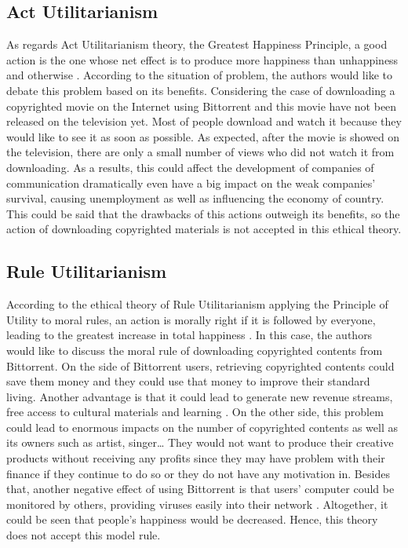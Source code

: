 \documentclass[conference]{IEEEtran}
\begin{document}
\subsection{Act Utilitarianism}
As regards Act Utilitarianism theory, the Greatest Happiness Principle, a good action is the one whose net effect is to produce more happiness than unhappiness and otherwise \cite{quinn2014ethics}. According to the situation of problem, the authors would like to debate this problem based on its benefits. Considering the case of downloading a copyrighted movie on the Internet using Bittorrent and this movie have not been released on the television yet. Most of people download and watch it because they would like to see it as soon as possible. As expected, after the movie is showed on the television, there are only a small number of views who did not watch it from downloading. As a results, this could affect the development of companies of communication dramatically even have a big impact on the weak companies’ survival, causing unemployment as well as influencing the economy of country. This could be said that the drawbacks of this actions outweigh its benefits, so the action of downloading copyrighted materials is not accepted in this ethical theory.
\cite{bittorentmedia}


\subsection{Rule Utilitarianism}
According to the ethical theory of Rule Utilitarianism applying the Principle of Utility to moral rules, an action is morally right if it is followed by everyone, leading to the greatest increase in total happiness \cite{quinn2014ethics}. In this case, the authors would like to discuss the moral rule of downloading copyrighted contents from Bittorrent. On the side of Bittorrent users, retrieving copyrighted contents could save them money and they could use that money to improve their standard living. Another advantage is that it could lead to generate new revenue streams, free access to cultural materials and learning \cite{bittorenethics} . On the other side, this problem could lead to enormous impacts on the number of copyrighted contents as well as its owners such as artist, singer… They would not want to produce their creative products without receiving any profits since they may have problem with their finance if they continue to do so or they do not have any motivation in. Besides that, another negative effect of using Bittorrent is that users’ computer could be monitored by others, providing viruses easily into their network \cite{bittorendanger}. Altogether, it could be seen that people’s happiness would be decreased. Hence, this theory does not accept this model rule.
\end{document}
